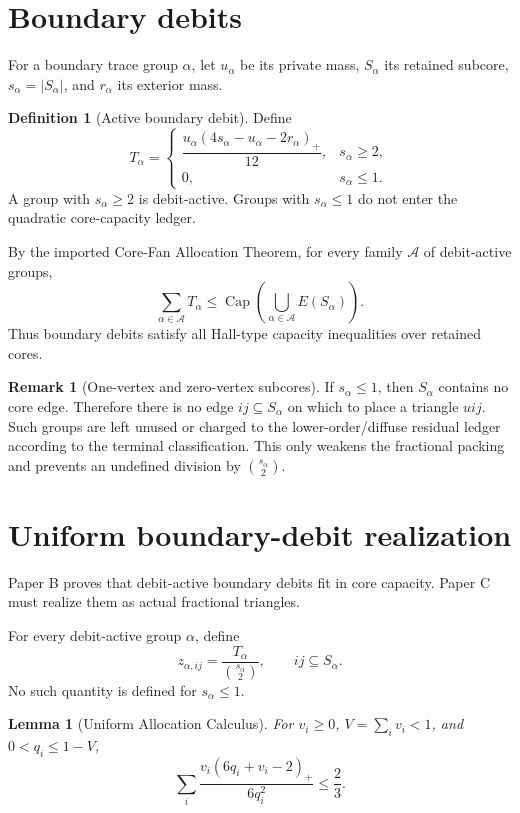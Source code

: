 \documentclass[11pt]{article}
\newtheorem{lemma}[theorem]{Lemma}
\theoremstyle{definition}
\newtheorem{definition}[theorem]{Definition}
\newtheorem{remark}[theorem]{Remark}
\newcommand{\CoreCap}{\operatorname{Cap}}
\newcommand{\calA}{\mathcal A}
\begin{document}
\section{Boundary debits}

For a boundary trace group \(\alpha\), let \(u_\alpha\) be its private mass, \(S_\alpha\) its retained subcore, \(s_\alpha=|S_\alpha|\), and \(r_\alpha\) its exterior mass.

\begin{definition}[Active boundary debit]
Define
\[
T_\alpha
=
\begin{cases}
\dfrac{u_\alpha(4s_\alpha-u_\alpha-2r_\alpha)_+}{12},
& s_\alpha\ge2,\\[1.2ex]
0,
& s_\alpha\le1.
\end{cases}
\]
A group with \(s_\alpha\ge2\) is debit-active. Groups with \(s_\alpha\le1\) do not enter the quadratic core-capacity ledger.
\end{definition}

By the imported Core-Fan Allocation Theorem, for every family \(\calA\) of debit-active groups,
\[
    \sum_{\alpha\in\calA}T_\alpha
    \le
    \CoreCap
    \left(
    \bigcup_{\alpha\in\calA}E(S_\alpha)
    \right).
\]
Thus boundary debits satisfy all Hall-type capacity inequalities over retained cores.

\begin{remark}[One-vertex and zero-vertex subcores]
If \(s_\alpha\le1\), then \(S_\alpha\) contains no core edge. Therefore there is no edge \(ij\subseteq S_\alpha\) on which to place a triangle \(uij\). Such groups are left unused or charged to the lower-order/diffuse residual ledger according to the terminal classification. This only weakens the fractional packing and prevents an undefined division by \(\binom{s_\alpha}{2}\).
\end{remark}

\section{Uniform boundary-debit realization}

Paper B proves that debit-active boundary debits fit in core capacity. Paper C must realize them as actual fractional triangles.

For every debit-active group \(\alpha\), define
\[
    z_{\alpha,ij}
    =
    \frac{T_\alpha}{\binom{s_\alpha}{2}},
    \qquad
    ij\subseteq S_\alpha.
\]
No such quantity is defined for \(s_\alpha\le1\).

\begin{lemma}[Uniform Allocation Calculus]\label{lem:uniform-calculus}
For \(v_i\ge0\), \(V=\sum_i v_i<1\), and \(0<q_i\le1-V\),
\[
\sum_i
\frac{
v_i(6q_i+v_i-2)_+
}{6q_i^2}
\le
\frac23.
\]
\end{lemma}
\end{document}
